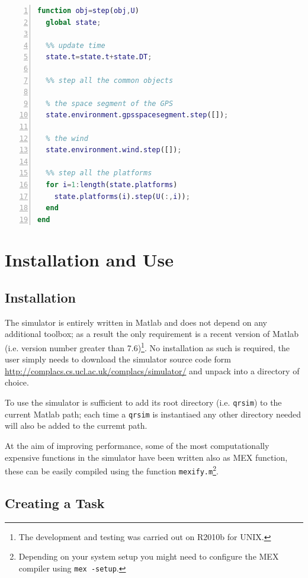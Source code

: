 \documentclass[a4paper,11pt]{report}
\newcommand{\sname}{QRsim\xspace}
\newcommand{\web}{\url{http://complacs.cs.ucl.ac.uk/complacs/simulator/}\xspace}
\begin{document}
\begin{lstlisting}[float=ht!bp,caption=\sname step() method,language=Matlab,frame=lines,label=lst:step,numbers=left,basicstyle=\small]
function obj=step(obj,U)
  global state;
           
  %% update time
  state.t=state.t+state.DT;
                        
  %% step all the common objects
            
  % the space segment of the GPS
  state.environment.gpsspacesegment.step([]);
            
  % the wind
  state.environment.wind.step([]);
            
  %% step all the platforms            
  for i=1:length(state.platforms)
    state.platforms(i).step(U(:,i));
  end
end
\end{lstlisting}


\chapter{Installation and Use}

\section{Installation}
The simulator is entirely written in Matlab and does not depend on any additional toolbox; as a result the only requirement is a recent version of Matlab (i.e. version number greater  than 7.6)\footnote{The development and testing was carried out on R2010b for UNIX.}.
No installation as such is required, the user simply needs to download the simulator source code form \web and unpack into a directory of choice.

To use the simulator is sufficient to add its root directory (i.e. \texttt{qrsim}) to the current Matlab path; each time a \texttt{qrsim} is instantiaed any other directory needed will also be added to the curremt path.

At the aim of improving performance, some of the most computationally expensive functions in the simulator have been written also as MEX function, these can be easily compiled using the function \texttt{mexify.m}\footnote{Depending on your system setup you might need to configure the MEX compiler using \texttt{mex -setup}.}.


\section{Creating a Task}  \label{sec:createtask}
\end{document}
